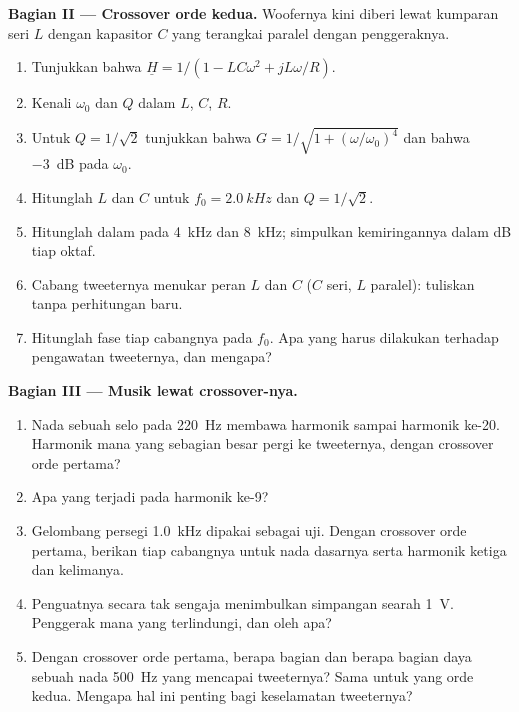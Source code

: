\begin{problem}
\medskip
\noindent\textbf{Bagian II --- Crossover orde kedua.}
Woofernya kini diberi lewat kumparan seri $L$ dengan kapasitor $C$ yang
terangkai paralel dengan penggeraknya.
\begin{enumerate}[resume]
  \item Tunjukkan bahwa $\underline H = 1/(1 - LC\omega^2 + jL\omega/R)$.
  \item Kenali $\omega_0$ dan $Q$ dalam $L$, $C$, $R$.
  \item Untuk $Q = 1/\sqrt2$ tunjukkan bahwa $G = 1/\sqrt{1 + (\omega/\omega_0)^4}$
        dan bahwa  \qty{-3}{dB} pada $\omega_0$.
  \item Hitunglah $L$ dan $C$ untuk $f_0 = \qty{2.0}{kHz}$ dan $Q = 1/\sqrt2$.
  \item Hitunglah  dalam  pada \qty{4}{kHz} dan
        \qty{8}{kHz}; simpulkan kemiringannya dalam dB tiap oktaf.
  \item Cabang tweeternya menukar peran $L$ dan $C$ ($C$ seri, $L$
        paralel): tuliskan  tanpa perhitungan baru.
  \item Hitunglah fase tiap cabangnya pada $f_0$. Apa yang harus
        dilakukan terhadap pengawatan tweeternya, dan mengapa?
\end{enumerate}

\medskip
\noindent\textbf{Bagian III --- Musik lewat crossover-nya.}
\begin{enumerate}[resume]
  \item Nada sebuah selo pada \qty{220}{Hz} membawa harmonik sampai
        harmonik ke-20. Harmonik mana yang sebagian besar pergi ke
        tweeternya, dengan crossover orde pertama?
  \item Apa yang terjadi pada harmonik ke-9?
  \item Gelombang persegi \qty{1.0}{kHz} dipakai sebagai  uji.
        Dengan crossover orde pertama, berikan  tiap cabangnya
        untuk nada dasarnya serta harmonik ketiga dan kelimanya.
  \item Penguatnya secara tak sengaja menimbulkan simpangan searah
        \qty{1}{V}. Penggerak mana yang terlindungi, dan oleh apa?
  \item Dengan crossover orde pertama, berapa bagian  dan berapa
        bagian daya sebuah nada \qty{500}{Hz} yang mencapai tweeternya?
        Sama untuk yang orde kedua. Mengapa hal ini penting bagi
        keselamatan tweeternya?
\end{enumerate}


\end{problem}
